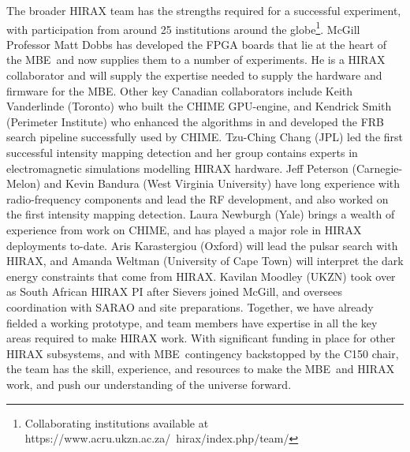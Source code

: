 \documentclass[letterpaper,11pt,preprint]{aastex}
\newcommand{\mbe}{{\rm MBE}}
\begin{document}
The broader HIRAX team has the strengths required for a successful
experiment, with participation from around 25 institutions around the
globe\footnote{Collaborating institutions available at
  https://www.acru.ukzn.ac.za/~hirax/index.php/team/}.  McGill
Professor Matt Dobbs has developed the FPGA boards that lie at the
heart of the \mbe\ and now supplies them to a number of experiments.
He is a HIRAX collaborator and will supply the expertise needed to
supply the hardware and firmware for the \mbe.  Other key Canadian
collaborators include Keith Vanderlinde (Toronto) who built the CHIME
GPU-engine, and Kendrick Smith (Perimeter Institute) who enhanced the
algorithms in \citet{Masui15} and developed the FRB search pipeline
successfully used by CHIME.
Tzu-Ching Chang (JPL) led the first successful intensity
mapping detection \citep{Chang10} and her group contains experts in
electromagnetic simulations modelling HIRAX hardware.  Jeff Peterson
(Carnegie-Melon) and Kevin Bandura (West Virginia University) have
long experience with radio-frequency components and lead the RF
development, and also worked on the first intensity mapping detection.
Laura Newburgh (Yale) brings a wealth of experience from work on
CHIME, and has played a major role in HIRAX deployments to-date.  Aris
Karastergiou (Oxford) will lead the pulsar search with HIRAX, and
Amanda Weltman (University of Cape Town) will interpret the dark
energy constraints that come from HIRAX.  Kavilan Moodley (UKZN) took
over as South African HIRAX PI after Sievers joined McGill, and
oversees coordination with SARAO and site preparations.  Together, we
have already fielded a working prototype, and team members have
expertise in all the key areas required to make HIRAX work.  With
significant funding in place for other HIRAX subsystems, and with
\mbe\ contingency backstopped by the C150 chair, the team has the
skill, experience, and resources to make the \mbe\ and HIRAX work, and
push our understanding of the universe forward.
\end{document}
